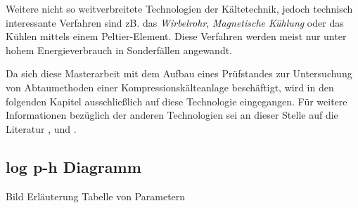 Weitere nicht so weitverbreitete Technologien der Kältetechnik, jedoch technisch interessante Verfahren  sind zB. das  \textit{Wirbelrohr},  \textit{Magnetische Kühlung} oder das Kühlen mittels einem Peltier-Element. Diese Verfahren werden meist nur unter hohem Energieverbrauch in Sonderfällen angewandt. \citep{Grote2014}

Da sich diese Masterarbeit mit dem Aufbau eines Prüfstandes zur Untersuchung von Abtaumethoden einer Kompressionskälteanlage beschäftigt, wird in den folgenden Kapitel ausschließlich auf diese Technologie eingegangen. Für weitere Informationen bezüglich der anderen Technologien sei an dieser Stelle auf die Literatur \citep{Baehr2013}, \citep{Grote2014} und \citep{Grote2014}.





\subsection{log p-h Diagramm}
\label{subsec:log p-h Diagramm}

Bild
Erläuterung
Tabelle von Parametern